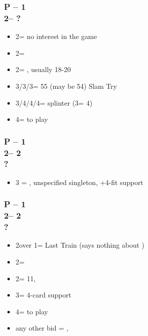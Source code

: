 \documentclass[12pt, a4paper]{article}
\begin{document}
\subsubsection*{P -- 1\spades \\ 2\clubs -- ?}
\begin{itemize}
    \item 2\spades = no interest in the game
    \item 2\diams = \inv
    \item 2\nt = \lsf, usually 18-20 \bal
    \item 3\clubs/3\diams/3\hearts = 55 (may be 54) Slam Try
    \item 3\nt/4\clubs/4\diams/4\hearts = splinter (3\nt = 4\hearts)
    \item 4\spades = to play
\end{itemize}

\subsubsection*{P -- 1\major \\ 2\clubs -- 2\major \\ ?}
\begin{itemize}
    \item 3 = \nat, unspecified singleton, +4-fit \major support
\end{itemize}

\subsubsection*{P -- 1\major \\ 2\clubs -- 2\diams \\ ?}
\begin{itemize}
    \item 2\hearts over 1\spades = Last Train (says nothing about \hearts)
    \item 2\major = \soff
    \item 2\nt = 11, \bal
    \item 3\major = 4-card support
    \item 4\major = to play
    \item any other bid = \nat, \inv
\end{itemize}

\end{document}
